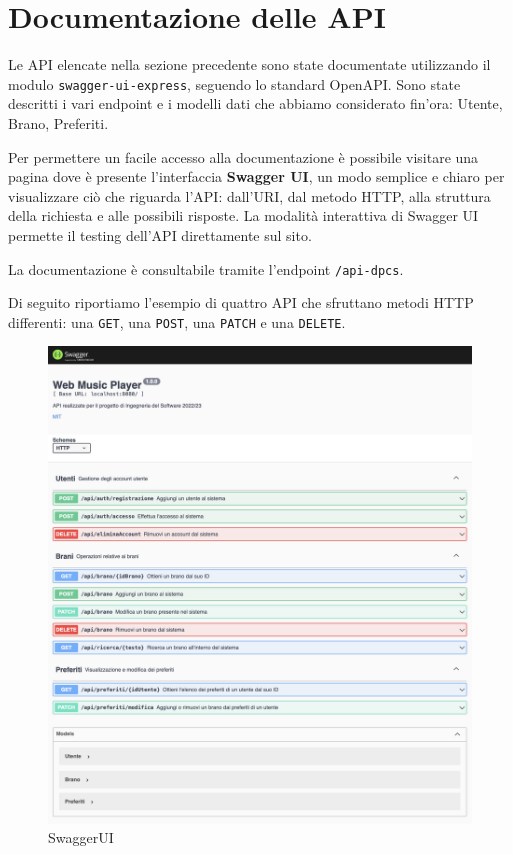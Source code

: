 \documentclass[a4paper,12pt]{article}
\begin{document}
\newpage
\section{Documentazione delle API}

Le API elencate nella sezione precedente sono state documentate utilizzando il modulo \texttt{swagger-ui-express}, seguendo lo standard OpenAPI. Sono state descritti i vari endpoint e i modelli dati che abbiamo considerato fin'ora: Utente, Brano, Preferiti.

Per permettere un facile accesso alla documentazione è possibile visitare una pagina dove è presente l'interfaccia \textbf{Swagger UI}, un modo semplice e chiaro per visualizzare ciò che riguarda l'API: dall'URI, dal metodo HTTP, alla struttura della richiesta e alle possibili risposte. La modalità interattiva di Swagger UI permette il testing dell'API direttamente sul sito.

La documentazione è consultabile tramite l'endpoint \texttt{/api-dpcs}.

Di seguito riportiamo l'esempio di quattro API che sfruttano metodi HTTP differenti: una \texttt{GET}, una \texttt{POST}, una \texttt{PATCH} e una \texttt{DELETE}.

\begin{figure}[htp]
    \centering
    \includegraphics[width=\textwidth]{code/documentazione-swagger-ui.png}
    \caption{SwaggerUI}
\end{figure}
\end{document}
